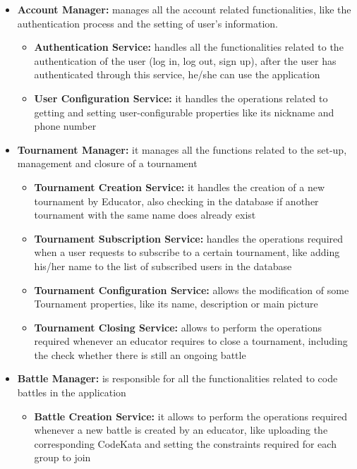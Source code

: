 \documentclass[../DD.tex]{subfiles}
\begin{document}
    \begin{itemize}
        \item \textbf{Account Manager:} manages all the account related functionalities, like the authentication process and the setting of user's information.
        \begin{itemize}
            \item \textbf{Authentication Service:} handles all the functionalities related to the authentication of the user (log in, log out, sign up), after the user has authenticated through this service, he/she can use the application
            \item \textbf{User Configuration Service:} it handles the operations related to getting and setting user-configurable properties like its nickname and phone number
        \end{itemize}
        \item \textbf{Tournament Manager:} it manages all the functions related to the set-up, management and closure of a tournament
        \begin{itemize}
            \item \textbf{Tournament Creation Service:} it handles the creation of a new tournament by Educator, also checking in the database if another tournament with the same name does already exist
            \item \textbf{Tournament Subscription Service:} handles the operations required when a user requests to subscribe to a certain tournament, like adding his/her name to the list of subscribed users in the database
            \item \textbf{Tournament Configuration Service:} allows the modification of some Tournament properties, like its name, description or main picture
            \item \textbf{Tournament Closing Service:} allows to perform the operations required whenever an educator requires to close a tournament, including the check whether there is still an ongoing battle
        \end{itemize}
        \item \textbf{Battle Manager:} is responsible for all the functionalities related to code battles in the application
        \begin{itemize}
            \item \textbf{Battle Creation Service:} it allows to perform the operations required whenever a new battle is created by an educator, like uploading the corresponding CodeKata and setting the constraints required for each group to join

\end{itemize}
\end{itemize}
\end{document}
